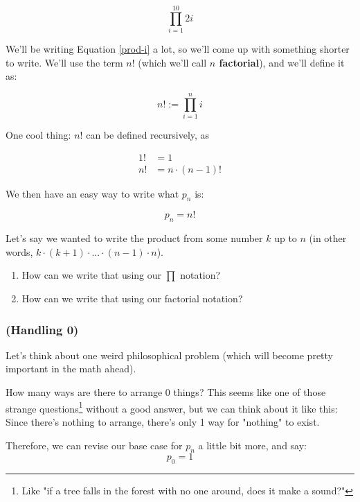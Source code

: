 \begin{equation*}
\prod_{i=1}^{10} 2i
\end{equation*}

We'll be writing Equation \ref{prod-i} a lot, so we'll come up with something shorter to write. We'll use the term $n!$ (which we'll call \textbf{$n$ factorial}), and we'll define it as:

\begin{equation}
\label{eq:factorial-def}
n! := \prod_{i=1}^n i
\end{equation}

One cool thing: $n!$ can be defined recursively, as

\begin{align}
1! &= 1 \\
n! &= n \cdot (n-1)!
\end{align}

We then have an easy way to write what $p_n$ is:

\begin{equation}
p_n = n!
\end{equation}

\begin{exercise}
\label{ex:factorial-quotient}
Let's say we wanted to write the product from some number $k$ up to $n$ (in other words, $k \cdot (k+1) \cdot ... \cdot (n-1) \cdot n$). 
\begin{enumerate}
\item How can we write that using our $\prod$ notation?
\item How can we write that using our factorial notation?
\end{enumerate}
\end{exercise}


\subsubsection{(Handling 0)}

Let's think about one weird philosophical problem (which will become pretty important in the math ahead).

How many ways are there to arrange 0 things? This seems like one of those strange questions\footnote{Like "if a tree falls in the forest with no one around, does it make a sound?"} without a good answer, but we can think about it like this: Since there's nothing to arrange, there's only 1 way for "nothing" to exist. 

Therefore, we can revise our base case for $p_n$ a little bit more, and say:
\begin{equation*}
p_0 = 1
\end{equation*}

